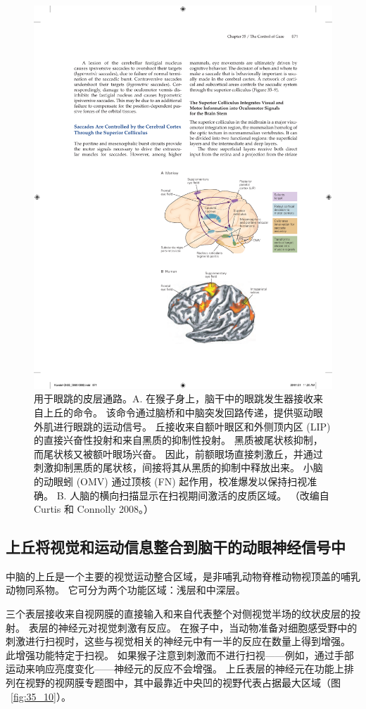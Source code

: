 \begin{figure}[htbp]
	\centering
	\includegraphics[width=0.6\linewidth]{chap35/fig_35_9}
	\caption{用于眼跳的皮层通路。A. 在猴子身上，脑干中的眼跳发生器接收来自上丘的命令。 该命令通过脑桥和中脑突发回路传递，提供驱动眼外肌进行眼跳的运动信号。 丘接收来自额叶眼区和外侧顶内区 (LIP) 的直接兴奋性投射和来自黑质的抑制性投射。 黑质被尾状核抑制，而尾状核又被额叶眼场兴奋。 因此，前额眼场直接刺激丘，并通过刺激抑制黑质的尾状核，间接将其从黑质的抑制中释放出来。 小脑的动眼蚓 (OMV) 通过顶核 (FN) 起作用，校准爆发以保持扫视准确。 B. 人脑的横向扫描显示在扫视期间激活的皮质区域。 （改编自 Curtis 和 Connolly 2008。）}
	\label{fig:35_9}
\end{figure}



\subsection{上丘将视觉和运动信息整合到脑干的动眼神经信号中}

中脑的上丘是一个主要的视觉运动整合区域，是非哺乳动物脊椎动物视顶盖的哺乳动物同系物。
它可分为两个功能区域：浅层和中深层。


三个表层接收来自视网膜的直接输入和来自代表整个对侧视觉半场的纹状皮层的投射。
表层的神经元对视觉刺激有反应。
在猴子中，当动物准备对细胞感受野中的刺激进行扫视时，这些与视觉相关的神经元中有一半的反应在数量上得到增强。
此增强功能特定于扫视。
如果猴子注意到刺激而不进行扫视——例如，通过手部运动来响应亮度变化——神经元的反应不会增强。
上丘表层的神经元在功能上排列在视野的视网膜专题图中，其中最靠近中央凹的视野代表占据最大区域（图 ~\ref{fig:35_10}）。


